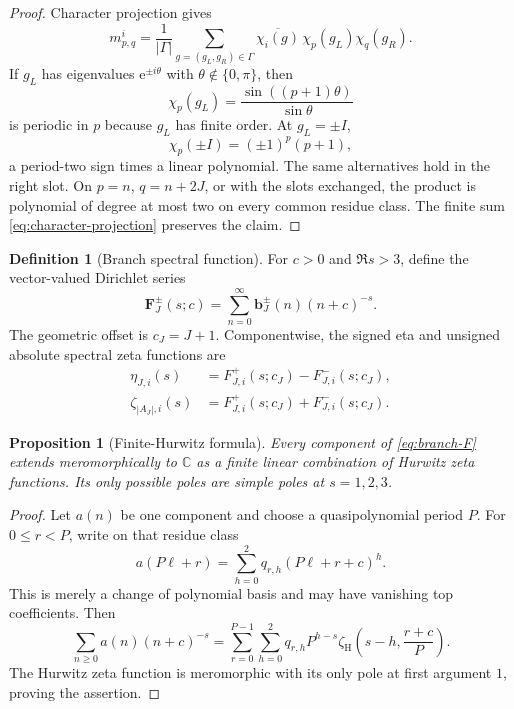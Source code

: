 \documentclass[11pt]{article}
\newtheorem{proposition}[theorem]{Proposition}
\theoremstyle{definition}
\newtheorem{definition}[theorem]{Definition}
\newcommand{\C}{\mathbb C}
\newcommand{\e}{\mathrm e}
\newcommand{\zH}{\zeta_{\mathrm H}}
\begin{document}
\begin{proof}
Character projection gives
\begin{equation}
 m_{p,q}^i
 =\frac1{|\Gamma|}
 \sum_{g=(g_L,g_R)\in\Gamma}
 \overline{\chi_i(g)}\,
 \chi_p(g_L)\chi_q(g_R).
 \label{eq:character-projection}
\end{equation}
If $g_L$ has eigenvalues $\e^{\pm i\theta}$ with
$\theta\notin\{0,\pi\}$, then
\[
 \chi_p(g_L)=\frac{\sin((p+1)\theta)}{\sin\theta}
\]
is periodic in $p$ because $g_L$ has finite order.  At $g_L=\pm I$,
\[
 \chi_p(\pm I)=(\pm1)^p(p+1),
\]
a period-two sign times a linear polynomial.  The same alternatives
hold in the right slot.  On $p=n$, $q=n+2J$, or with the slots
exchanged, the product is polynomial of degree at most two on every
common residue class.  The finite sum
\eqref{eq:character-projection} preserves the claim.
\end{proof}

\begin{definition}[Branch spectral function]
\label{def:branch-F}
For $c>0$ and $\Re s>3$, define the vector-valued Dirichlet series
\begin{equation}
 \boldsymbol F_J^\pm(s;c)
 =\sum_{n=0}^{\infty}
 \boldsymbol b_J^\pm(n)(n+c)^{-s}.
 \label{eq:branch-F}
\end{equation}
The geometric offset is $c_J=J+1$.  Componentwise, the signed eta and
unsigned absolute spectral zeta functions are
\begin{align}
 \eta_{J,i}(s)
 &=F_{J,i}^+(s;c_J)-F_{J,i}^-(s;c_J),
 \label{eq:eta-from-branches}\\
 \zeta_{|A_J|,i}(s)
 &=F_{J,i}^+(s;c_J)+F_{J,i}^-(s;c_J).
 \label{eq:zeta-from-branches}
\end{align}
\end{definition}

\begin{proposition}[Finite-Hurwitz formula]
\label{prop:finite-hurwitz}
Every component of \eqref{eq:branch-F} extends meromorphically to
$\C$ as a finite linear combination of Hurwitz zeta functions.  Its
only possible poles are simple poles at $s=1,2,3$.
\end{proposition}

\begin{proof}
Let $a(n)$ be one component and choose a quasipolynomial period $P$.
For $0\leq r<P$, write on that residue class
\[
 a(P\ell+r)
 =\sum_{h=0}^{2}q_{r,h}(P\ell+r+c)^h .
\]
This is merely a change of polynomial basis and may have vanishing
top coefficients.  Then
\begin{equation}
 \sum_{n\geq0}a(n)(n+c)^{-s}
 =
 \sum_{r=0}^{P-1}\sum_{h=0}^{2}
 q_{r,h}P^{h-s}
 \zH\!\left(s-h,\frac{r+c}{P}\right).
 \label{eq:finite-Hurwitz}
\end{equation}
The Hurwitz zeta function is meromorphic with its only pole at first
argument $1$, proving the assertion.
\end{proof}
\end{document}
